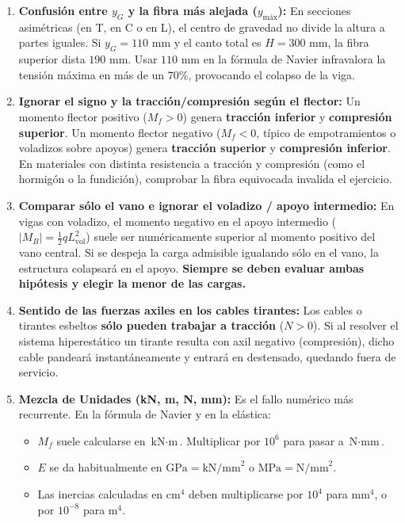 \begin{tcolorbox}[colback=red!5!white,colframe=red!80!black,title=\textbf{\Large Trampas y Errores Habituales en Exámenes Oficiales}]
    \begin{enumerate}
        \item \textbf{Confusión entre $y_G$ y la fibra más alejada ($y_{\text{máx}}$):}
              En secciones asimétricas (en T, en C o en L), el centro de gravedad no divide la altura a partes iguales. Si $y_G = 110\text{ mm}$ y el canto total es $H = 300\text{ mm}$, la fibra superior dista $190\text{ mm}$. Usar $110\text{ mm}$ en la fórmula de Navier infravalora la tensión máxima en más de un 70\%, provocando el colapso de la viga.
              
        \item \textbf{Ignorar el signo y la tracción/compresión según el flector:}
              Un momento flector positivo ($M_f > 0$) genera \textbf{tracción inferior} y \textbf{compresión superior}. Un momento flector negativo ($M_f < 0$, típico de empotramientos o voladizos sobre apoyos) genera \textbf{tracción superior} y \textbf{compresión inferior}. En materiales con distinta resistencia a tracción y compresión (como el hormigón o la fundición), comprobar la fibra equivocada invalida el ejercicio.

        \item \textbf{Comparar sólo el vano e ignorar el voladizo / apoyo intermedio:}
              En vigas con voladizo, el momento negativo en el apoyo intermedio ($|M_B| = \frac{1}{2} q L_{\text{vol}}^2$) suele ser numéricamente superior al momento positivo del vano central. Si se despeja la carga admisible igualando sólo en el vano, la estructura colapsará en el apoyo. \textbf{Siempre se deben evaluar ambas hipótesis y elegir la menor de las cargas.}

        \item \textbf{Sentido de las fuerzas axiles en los cables tirantes:}
              Los cables o tirantes esbeltos \textbf{sólo pueden trabajar a tracción} ($N > 0$). Si al resolver el sistema hiperestático un tirante resulta con axil negativo (compresión), dicho cable pandeará instantáneamente y entrará en destensado, quedando fuera de servicio.

        \item \textbf{Mezcla de Unidades (kN, m, N, mm):}
              Es el fallo numérico más recurrente. En la fórmula de Navier y en la elástica:
              \begin{itemize}
                  \item $M_f$ suele calcularse en $\text{kN}\cdot\text{m}$. Multiplicar por $10^6$ para pasar a $\text{N}\cdot\text{mm}$.
                  \item $E$ se da habitualmente en $\text{GPa} = \text{kN/mm}^2$ o $\text{MPa} = \text{N/mm}^2$.
                  \item Las inercias calculadas en $\text{cm}^4$ deben multiplicarse por $10^4$ para $\text{mm}^4$, o por $10^{-8}$ para $\text{m}^4$.
              \end{itemize}


\end{enumerate}
\end{tcolorbox}
